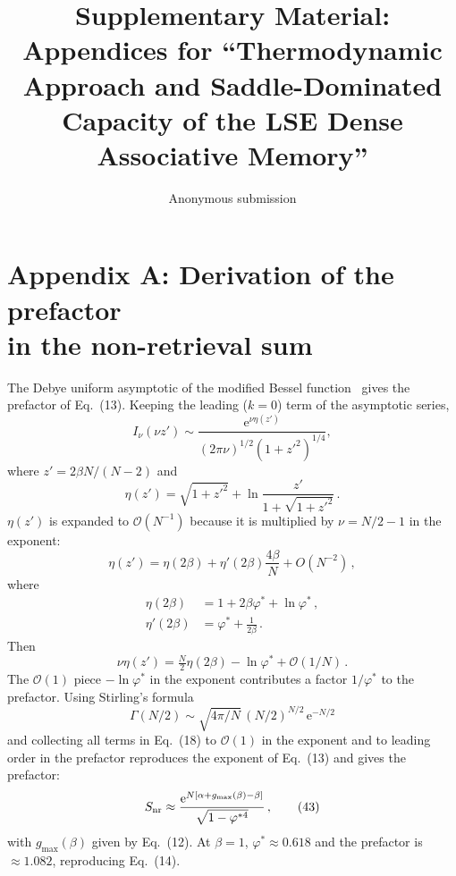 \documentclass[letterpaper]{article} %
\title{\bfseries Supplementary Material:\\Appendices for ``Thermodynamic Approach and Saddle-Dominated Capacity of the LSE Dense Associative Memory''}
\author{Anonymous submission}
\newcommand{\e}{{\mathrm{e}}}
\newcommand{\Bnet}{\beta}
\begin{document}
\maketitle

\appendix

\section{Appendix A: Derivation of the prefactor \\in the non-retrieval sum}

The Debye uniform asymptotic of the modified Bessel function~\citep[10.41.3]{olver2010nist}
gives the prefactor of Eq.~(13). Keeping the leading ($k = 0$) term of
the asymptotic series,
\begin{equation}
I_\nu(\nu z') \sim \frac{\e^{\nu\eta(z')}}{(2\pi\nu)^{1/2}(1+{z'}^2)^{1/4}},
\tag{36}
\end{equation}
where $z' = 2\Bnet N/(N-2)$ and
\begin{equation}
    \eta(z') = \sqrt{1+{z'}^2} + \ln\frac{z'}{1+\sqrt{1+{z'}^2}}\,.
    \tag{37}
    \label{eq:bessel_debye}
\end{equation}
$\eta(z')$ is expanded to $\mathcal{O}(N^{-1})$ because it is multiplied by
$\nu = N/2 - 1$ in the exponent:
\begin{equation}
    \eta(z') = \eta(2\Bnet) + \eta'(2\Bnet) \frac{4\Bnet}{N} + O(N^{-2})\,,
    \tag{38}
\end{equation}
where
\begin{align}
    \eta(2\Bnet)  &= 1 + 2\Bnet\varphi^* + \ln\varphi^*\,, \tag{39}\\
    \eta'(2\Bnet) &= \varphi^* + \frac{1}{2\Bnet}\,. \tag{40}
\end{align}
Then
\begin{equation}
    \nu \eta(z') = \tfrac{N}{2} \eta(2\Bnet) - \ln\varphi^* + \mathcal{O}(1/N)\,.
    \tag{41}
\end{equation}
The $\mathcal{O}(1)$ piece $-\ln\varphi^*$ in the exponent contributes a factor
$1/\varphi^*$ to the prefactor. Using Stirling's formula
\begin{equation}
    \Gamma(N/2) \sim \sqrt{4\pi/N}\,(N/2)^{N/2}\,\e^{-N/2}
    \tag{42}
\end{equation}
and collecting all terms in Eq.~(18) to $\mathcal{O}(1)$ in the
exponent and to leading order in the prefactor reproduces the exponent
of Eq.~(13) and gives the prefactor:
\begin{equation}
S_{\rm nr} \approx \frac{\e^{N[\alpha + g_{\max}(\Bnet) - \Bnet]}}{\sqrt{1-\varphi^{*4}}}\,,
\tag{43}
\end{equation}
with $g_{\max}(\Bnet)$ given by Eq.~(12).
At $\Bnet = 1$, $\varphi^* \approx 0.618$ and the prefactor is $\approx 1.082$, reproducing Eq.~(14).
\end{document}
